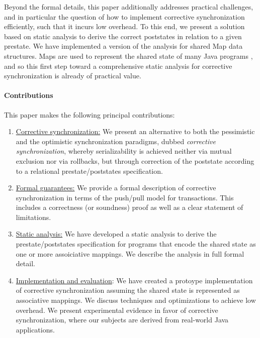 Beyond the formal details, this paper additionally addresses practical challenges, and in particular the question of how to implement corrective synchronization efficiently, such that it incurs low overhead. To this end, we present a solution based on static analysis to derive the correct poststates in relation to a given prestate. We have implemented a version of the analysis for shared {\sf Map} data structures. {\sf Map}s are used to represent the shared state of many Java programs \cite{XXX}, and so this first step toward a comprehensive static analysis for corrective synchronization is already of practical value.


\paragraph{Contributions} This paper makes the following principal contributions:
\begin{enumerate}
	\item \underline{Corrective synchronization:} We present an alternative to both the pessimistic and the optimistic synchronization paradigms, dubbed \emph{corrective synchronization}, whereby serializability is achieved neither via mutual exclusion nor via rollbacks, but through correction of the poststate according to a relational prestate/poststates specification.
	\item \underline{Formal guarantees:} We provide a formal description of corrective synchronization in terms of the push/pull model for transactions. This includes a correctness (or soundness) proof as well as a clear statement of limitations.
	\item \underline{Static analysis:} We have developed a static analysis to derive the prestate/poststates specification for programs that encode the shared state as one or more assoiciative mappings. We describe the analysis in full formal detail.
	\item \underline{Implementation and evaluation}: We have created a protoype implementation of corrective synchronization assuming the shared state is represented as associative mappings. We discuss techniques and optimizations to achieve low overhead. We present experimental evidence in favor of corrective synchronization, where our subjects are derived from real-world Java applications.
\end{enumerate}